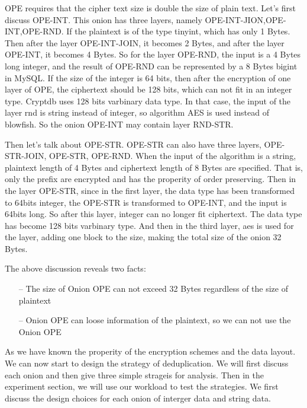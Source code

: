 OPE requires that the cipher text size is double the size of plain text. Let's first discuss OPE-INT. This onion has three layers, namely OPE-INT-JION,OPE-INT,OPE-RND. If the plaintext is of the type tinyint, which has only 1 Bytes. Then after the layer OPE-INT-JOIN, it becomes 2 Bytes, and after the layer OPE-INT, it becomes 4 Bytes. So for the layer OPE-RND, the input is a 4 Bytes long integer, and the result of OPE-RND can be represented by a 8 Bytes bigint in MySQL. If the size of the integer is 64 bits, then after the encryption of one layer of OPE, the ciphertext should be 128 bits, which can not fit in an integer type. Cryptdb uses 128 bits varbinary data type. In that case, the input of the layer rnd is string instead of integer, so algorithm AES is used instead of blowfish. So the onion OPE-INT may contain layer RND-STR. 

Then let's talk about OPE-STR. OPE-STR can also have three layers, OPE-STR-JOIN, OPE-STR, OPE-RND. When the input of the algorithm is a string, plaintext length of 4 Bytes and  ciphertext length of 8 Bytes are specified. That is, only the prefix are encrypted and has the properity of order preserving. Then in the layer OPE-STR, since in the first layer, the data type has been transformed to 64bits integer, the OPE-STR is transformed to OPE-INT, and the input is 64bits long. So after this layer, integer can no longer fit ciphertext. The data type has become 128 bits varbinary type. And then in the third layer, aes is used for the layer, adding one block to the size, making the total size of the onion 32 Bytes.


The above discussion reveals two facts:

\begin{itemize}
\item[--] The size of Onion OPE can not exceed 32 Bytes regardless of the size of plaintext
\item[--] Onion OPE can loose information of the plaintext, so we can not use the Onion OPE
\end{itemize}



As we have known the properity of the encryption schemes and the data layout. We can now start to design the strategy of deduplication. We will first discuss each onion and then give three simple strageis for analysis. Then in the experiment section, we will use our workload to test the strategies. We first discuss the design choices for each onion of interger data and string data. 


